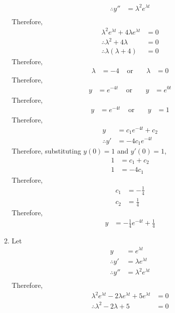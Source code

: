 \documentclass[fleqn, a4paper, 11pt, oneside]{amsart}
\theoremstyle{definition}
\theoremstyle{theorem}
\begin{document}
\begin{solution}
\begin{enumerate}[leftmargin = *]
\begin{align*}
				\therefore y'' & = \lambda^2 e^{\lambda t} \\
			\end{align*}
			Therefore,
			\begin{align*}
				\lambda^2 e^{\lambda t} + 4 \lambda e^{\lambda t} & = 0 \\
				\therefore \lambda^2 + 4 \lambda                  & = 0 \\
				\therefore \lambda (\lambda + 4)                  & = 0
			\end{align*}
			Therefore,
			\begin{align*}
				\lambda & = -4 & \text{ or } &  & \lambda & = 0
			\end{align*}
			Therefore,
			\begin{align*}
				y & = e^{-4 t} & \text{ or } &  & y & = e^{0 t}
			\end{align*}
			Therefore,
			\begin{align*}
				y & = e^{-4 t} & \text{ or } &  & y & = 1
			\end{align*}
			Therefore,
			\begin{align*}
				y &= c_1 e^{-4 t} + c_2\\
				\therefore y' &= -4 c_1 e^{-4 t}
			\end{align*}
			Therefore, substituting $y(0) = 1$ and $y'(0) = 1$,
			\begin{align*}
				1 &= c_1 + c_2\\
				1 &= -4 c_1
			\end{align*}
			Therefore,
			\begin{align*}
				c_1 &= -\frac{1}{4}\\
				c_2 &= \frac{1}{4}
			\end{align*}
			Therefore,
			\begin{align*}
				y &= -\frac{1}{4} e^{-4 t} + \frac{1}{4}
			\end{align*}
		\item
			Let
			\begin{align*}
				y              & = e^{\lambda t}           \\
				\therefore y'  & = \lambda e^{\lambda t}   \\
				\therefore y'' & = \lambda^2 e^{\lambda t} \\
			\end{align*}
			Therefore,
			\begin{align*}
				\lambda^2 e^{\lambda t} - 2 \lambda e^{\lambda t} + 5 e^{\lambda t} & = 0 \\
				\therefore \lambda^2 - 2 \lambda + 5                                & = 0

\end{align*}
\end{enumerate}
\end{solution}
\end{document}
